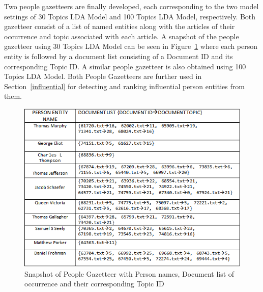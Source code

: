 \documentclass[10pt,journal,compsoc]{IEEEtran}
\begin{document}
Two people gazetteers are finally developed, each corresponding to the two model settings of 30 Topics LDA Model and 100 Topics LDA Model, respectively. Both gazetteer consist of a list of named entities along with the articles of their occurrence and topic associated with each article. A snapshot of the people gazetteer using 30 Topics LDA Model can be seen in Figure~\ref{figure:gazette} where each person entity is followed by a document list consisting of a Document ID and its corresponding Topic ID. A similar people gazetteer is also obtained using 100 Topics LDA Model. Both People Gazetteers are further used in Section~\ref{influential} for detecting and ranking influential person entities from them.
\begin{figure}
\centering
\includegraphics{gazetteer}
\caption{Snapshot of People Gazetteer with Person names, Document list of occurrence and their corresponding Topic ID}
\label{figure:gazette}
\end{figure} 







%
%
\end{document}
